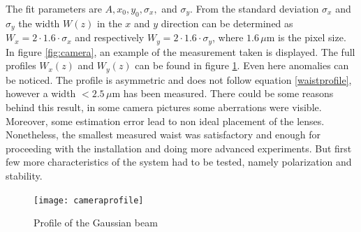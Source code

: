 The fit parameters are $A,x_0,y_0,\sigma_x,$ and $\sigma_y$. From the standard deviation $\sigma_x$ and $\sigma_y$ the width $W(z)$ in the $x$ and $y$ direction can be determined as $W_x = 2\cdot 1.6\cdot \sigma_x$ and respectively $W_y = 2\cdot 1.6\cdot \sigma_y$, where $1.6\,\mu$m is the pixel size.
In figure \ref{fig:camera}, an example of the measurement taken is displayed. The full profiles $W_x(z)$ and $W_{y}(z)$ can be found in figure \ref{cameraprofile}. Even here anomalies can be noticed. The profile is asymmetric and does not follow equation \ref{waistprofile}, however a width $<2.5\,\mu$m has been measured. There could be some reasons behind this result, in some camera pictures some aberrations were visible. Moreover, some estimation error lead to non ideal placement of the lenses. Nonetheless, the smallest measured waist was satisfactory and enough for proceeding with the installation and doing more advanced experiments. But first few more characteristics of the system had to be tested, namely polarization and stability.

\begin{figure}
\centering
\texttt{[image: cameraprofile]}
\caption{Profile of the Gaussian beam}
\label{cameraprofile}
\end{figure}

